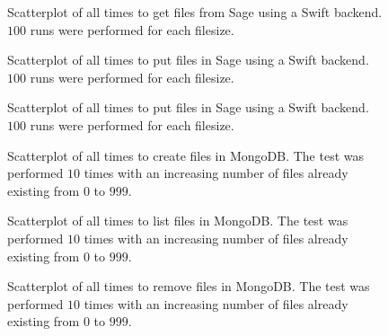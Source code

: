 \begin{figure}[!h]
\centering
{}
\caption[SageSwift Get Scatterplot]{Scatterplot of all times to get files from Sage using a Swift backend. $100$ runs were performed for each filesize.}
\label{fig:mongopointlogget}
\end{figure}

\begin{figure}[!h]
\centering
{}
\caption[SageSwift Put Scatterplot]{Scatterplot of all times to put files in Sage using a Swift backend. $100$ runs were performed for each filesize.}
\label{fig:mongopointlogput}
\end{figure}


\begin{figure}[!h]
\centering
{}
\caption[SageSwift Put Scatterplot]{Scatterplot of all times to put files in Sage using a Swift backend. $100$ runs were performed for each filesize.}
\label{fig:mongopointlogput}
\end{figure}


\begin{figure}[!h]
\centering
{}
\caption[Mongo Create Scatterplot]{Scatterplot of all times to create files in MongoDB. The test was performed $10$ times with an increasing number of files already existing from $0$ to $999$.}
\label{fig:mongocreatescatter}
\end{figure}

\begin{figure}[!h]
\centering
{}
\caption[Mongo List Scatterplot]{Scatterplot of all times to list files in MongoDB. The test was performed $10$ times with an increasing number of files already existing from $0$ to $999$.}
\label{fig:mongolistscatter}
\end{figure}

\begin{figure}[!h]
\centering
{}
\caption[Mongo Remove Scatterplot]{Scatterplot of all times to remove files in MongoDB. The test was performed $10$ times with an increasing number of files already existing from $0$ to $999$.}
\label{fig:mongoremovescatter}
\end{figure}



